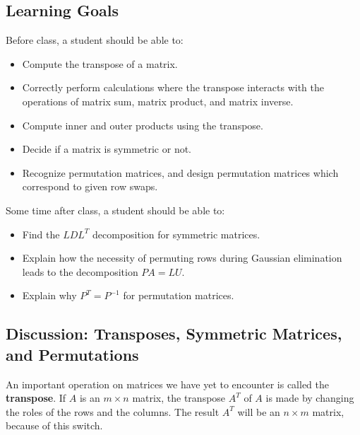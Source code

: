 \documentclass[10pt,]{book}
\newcommand{\terminology}[1]{\textbf{#1}}
\theoremstyle{plain}
\theoremstyle{definition}
\numberwithin{equation}{section}
\begin{document}
\subsection[Learning Goals]{Learning Goals}\label{subsection-52}
Before class, a student should be able to:%
\begin{itemize}
\item{}
        Compute the transpose of a matrix.
      \item{}
        Correctly perform calculations where the transpose interacts with the
        operations of matrix sum, matrix product, and matrix inverse.
      \item{}
        Compute inner and outer products using the transpose.
      \item{}
        Decide if a matrix is symmetric or not.
      \item{}
        Recognize permutation matrices, and design permutation matrices which
        correspond to given row swaps.
      \end{itemize}
\par

      Some time after class, a student should be able to:
\begin{itemize}
\item{}
        Find the \(LDL^T\) decomposition for symmetric matrices.
      \item{}
        Explain how the necessity of permuting rows during Gaussian elimination
        leads to the decomposition \(PA = LU\).
      \item{}
        Explain why \(P^T = P^{-1}\) for permutation matrices.
      \end{itemize}
\typeout{************************************************}
\typeout{************************************************}
\subsection[Discussion: Transposes, Symmetric Matrices, and Permutations]{Discussion: Transposes, Symmetric Matrices, and Permutations}\label{subsection-53}

      An important operation on matrices we have yet to encounter is called the
      \terminology{transpose}. If \(A\) is an \(m\times n\) matrix, the
      transpose \(A^T\) of
      \(A\) is made by changing the roles of the rows and the columns. The result
      \(A^T\) will be an \(n \times m\) matrix, because of this switch.
\par
\end{document}
